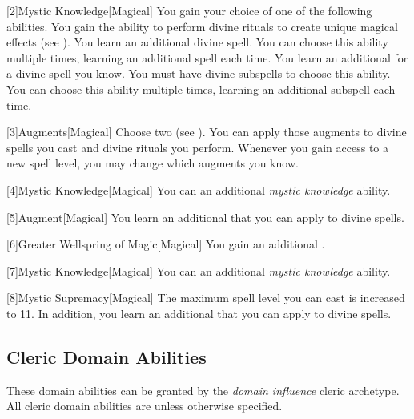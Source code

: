         [2]{Mystic Knowledge}[Magical]
        You gain your choice of one of the following abilities.
        {
             You gain the ability to perform divine rituals to create unique magical effects (see ).
             You learn an additional divine spell.
                You can choose this ability multiple times, learning an additional spell each time.
             You learn an additional  for a divine spell you know.
                You must have divine subspells to choose this ability.
                You can choose this ability multiple times, learning an additional subspell each time.
        }

        [3]{Augments}[Magical]
        Choose two  (see ).
        You can apply those augments to divine spells you cast and divine rituals you perform.
        Whenever you gain access to a new spell level, you may change which augments you know.

        [4]{Mystic Knowledge}[Magical]
        You can an additional \textit{mystic knowledge} ability.

        [5]{Augment}[Magical]
        You learn an additional  that you can apply to divine spells.

        [6]{Greater Wellspring of Magic}[Magical]
        You gain an additional .

        [7]{Mystic Knowledge}[Magical]
        You can an additional \textit{mystic knowledge} ability.

        [8]{Mystic Supremacy}[Magical]
        The maximum spell level you can cast is increased to 11.
        In addition, you learn an additional  that you can apply to divine spells.

    \subsection{Cleric Domain Abilities}\label{Cleric Domain Abilities}
        These domain abilities can be granted by the \textit{domain influence} cleric archetype.
        All cleric domain abilities are  unless otherwise specified.

